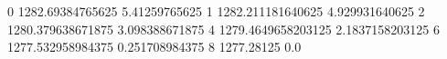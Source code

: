 0 1282.69384765625 5.41259765625
1 1282.211181640625 4.929931640625
2 1280.379638671875 3.098388671875
4 1279.4649658203125 2.1837158203125
6 1277.532958984375 0.251708984375
8 1277.28125 0.0
